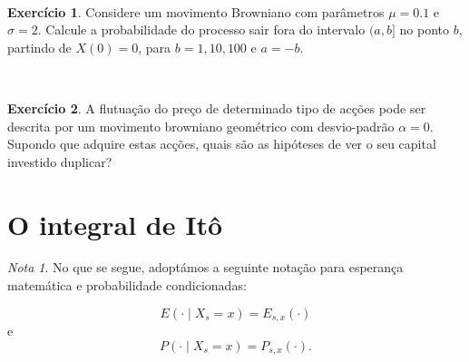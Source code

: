 \documentclass[
  11pt,
  a4paper,
]{book}
\theoremstyle{definition}
\theoremstyle{definition}
\theoremstyle{definition}
\newtheorem{exercise}{Exercício}[chapter]
\theoremstyle{definition}
\theoremstyle{remark}
\newtheorem*{remark}{Nota }
\begin{document}
\(\,\)

\begin{exercise}
\leavevmode

Considere um movimento Browniano com parâmetros \(\mu=0.1\) e \(\sigma =2\). Calcule a probabilidade do processo sair fora do intervalo \((a,b]\) no ponto \(b\), partindo de \(X(0)=0\), para \(b=1,10,100\) e \(a=-b\).

\end{exercise}

\(\,\)

\begin{exercise}
\leavevmode

A flutuação do preço de determinado tipo de acções pode ser descrita por um movimento browniano geométrico com desvio-padrão \(\alpha = 0\). Supondo que adquire estas acções, quais são as hipóteses de ver o seu capital investido duplicar?

\end{exercise}

\section{O integral de Itô}\label{o-integral-de-ito}

\begin{remark}
No que se segue, adoptámos a seguinte notação para esperança matemática e probabilidade condicionadas:

\[E(\cdot \mid X_s=x)=E_{s,x}(\cdot)\]
e
\[P(\cdot \mid X_s=x)=P_{s,x}(\cdot).\]
\end{remark}

\(\,\)
\end{document}
